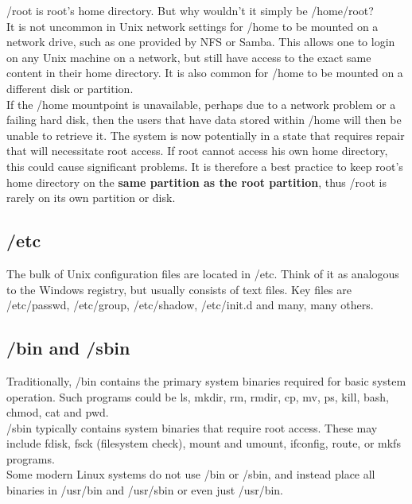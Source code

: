 /root is root's home directory.  But why wouldn't it simply be /home/root?\\

It is not uncommon in Unix network settings for /home to be mounted on a network drive, such as one provided by NFS or Samba.  This allows one to login on any Unix machine on a network, but still have access to the exact same content in their home directory.  It is also common for /home to be mounted on a different disk or partition.\\

If the /home mountpoint is unavailable, perhaps due to a network problem or a failing hard disk, then the users that have data stored within /home will then be unable to retrieve it.  The system is now potentially in a state that requires repair that will necessitate root access.  If root cannot access his own home directory, this could cause significant problems.  It is therefore a best practice to keep root's home directory on the \textbf{same partition as the root partition}, thus /root is rarely on its own partition or disk.\\

\subsection{/etc}

The bulk of Unix configuration files are located in /etc.  Think of it as analogous to the Windows registry, but usually consists of text files.  Key files are /etc/passwd, /etc/group, /etc/shadow, /etc/init.d and many, many others.

\subsection{/bin and /sbin}

Traditionally, /bin contains the primary system binaries required for basic system operation.  Such programs could be ls, mkdir, rm, rmdir, cp, mv, ps, kill, bash, chmod, cat and pwd.\\

/sbin typically contains system binaries that require root access.  These may include fdisk, fsck (filesystem check), mount and umount, ifconfig, route, or mkfs programs.\\

Some modern Linux systems do not use /bin or /sbin, and instead place all binaries in /usr/bin and /usr/sbin or even just /usr/bin.

